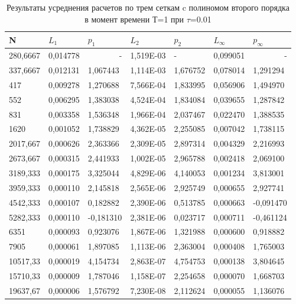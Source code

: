 \documentclass[14pt]{article}
\begin{document}
\begin{table}[]
\begin{tabular}{|l|l|l|l|l|l|l|}
\hline
\multicolumn{1}{|l|}{N} & \multicolumn{1}{l|}{$L_1$}        & \multicolumn{1}{l|}{$p_1$} & \multicolumn{1}{l|}{$L_2$}     & \multicolumn{1}{l|}{$p_2$} & \multicolumn{1}{l|}{$L_\infty$} & \multicolumn{1}{l|}{$p_\infty$} \\ \hline
280,6667 & 0,014778 & \multicolumn{1}{r|}{-} & 1,519E-03 & -        & 0,099051 & \multicolumn{1}{r|}{-} \\ \hline
337,6667 & 0,012131 & 1,067443               & 1,114E-03 & 1,676752 & 0,078014 & 1,291294               \\ \hline
417      & 0,009278 & 1,270688               & 7,566E-04 & 1,833995 & 0,056906 & 1,494970               \\ \hline
552      & 0,006295 & 1,383038               & 4,524E-04 & 1,834084 & 0,039655 & 1,287842               \\ \hline
831      & 0,003358 & 1,536348               & 1,966E-04 & 2,037467 & 0,022470 & 1,388535               \\ \hline
1620     & 0,001052 & 1,738829               & 4,362E-05 & 2,255085 & 0,007042 & 1,738115               \\ \hline
2017,667 & 0,000626 & 2,363366               & 2,309E-05 & 2,897314 & 0,004329 & 2,216993               \\ \hline
2673,667 & 0,000315 & 2,441933               & 1,002E-05 & 2,965788 & 0,002418 & 2,069100               \\ \hline
3189,333 & 0,000175 & 3,325044               & 4,829E-06 & 4,140053 & 0,001234 & 3,813001               \\ \hline
3959,333 & 0,000110 & 2,145818               & 2,565E-06 & 2,925749 & 0,000655 & 2,927741               \\ \hline
4542,333 & 0,000107 & 0,182882               & 2,390E-06 & 0,513785 & 0,000663 & -0,091470              \\ \hline
5282,333 & 0,000110 & -0,181310              & 2,381E-06 & 0,023717 & 0,000711 & -0,461124              \\ \hline
6351     & 0,000093 & 0,923076               & 1,867E-06 & 1,321988 & 0,000600 & 0,918882               \\ \hline
7905     & 0,000061 & 1,897085               & 1,113E-06 & 2,363004 & 0,000408 & 1,765003               \\ \hline
10517,33 & 0,000019 & 4,154734               & 2,863E-07 & 4,754753 & 0,000138 & 3,804645               \\ \hline
15710,33 & 0,000009 & 1,787046               & 1,158E-07 & 2,254658 & 0,000070 & 1,668703               \\ \hline
19637,67 & 0,000006 & 1,576792               & 7,230E-08 & 2,112624 & 0,000055 & 1,136076               \\ \hline
\end{tabular}
\caption{Результаты усреднения расчетов по трем сеткам c полиномом второго порядка в момент времени Т=1 при $\tau$=0.01}
\end{table}
\end{document}
